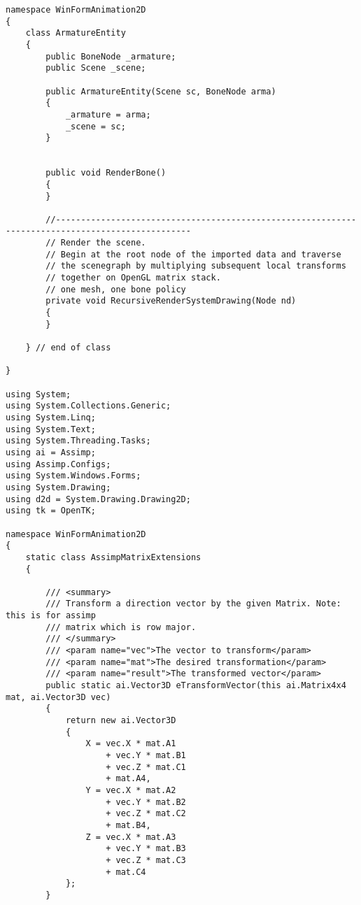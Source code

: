 \begin{scriptsize}
\begin{verbatim}
namespace WinFormAnimation2D
{
    class ArmatureEntity
    {
        public BoneNode _armature;
        public Scene _scene;

        public ArmatureEntity(Scene sc, BoneNode arma)
        {
            _armature = arma;
            _scene = sc;
        }


        public void RenderBone()
        {
        }

        //-------------------------------------------------------------------------------------------------
        // Render the scene.
        // Begin at the root node of the imported data and traverse
        // the scenegraph by multiplying subsequent local transforms
        // together on OpenGL matrix stack.
        // one mesh, one bone policy
        private void RecursiveRenderSystemDrawing(Node nd)
        {
        }

    } // end of class

}

using System;
using System.Collections.Generic;
using System.Linq;
using System.Text;
using System.Threading.Tasks;
using ai = Assimp;
using Assimp.Configs;
using System.Windows.Forms;
using System.Drawing;
using d2d = System.Drawing.Drawing2D;
using tk = OpenTK;

namespace WinFormAnimation2D
{
    static class AssimpMatrixExtensions
    {

        /// <summary>
        /// Transform a direction vector by the given Matrix. Note: this is for assimp 
        /// matrix which is row major.
        /// </summary>
        /// <param name="vec">The vector to transform</param>
        /// <param name="mat">The desired transformation</param>
        /// <param name="result">The transformed vector</param>
        public static ai.Vector3D eTransformVector(this ai.Matrix4x4 mat, ai.Vector3D vec)
        {
            return new ai.Vector3D
            {
                X = vec.X * mat.A1
                    + vec.Y * mat.B1
                    + vec.Z * mat.C1
                    + mat.A4,
                Y = vec.X * mat.A2
                    + vec.Y * mat.B2
                    + vec.Z * mat.C2
                    + mat.B4,
                Z = vec.X * mat.A3
                    + vec.Y * mat.B3
                    + vec.Z * mat.C3
                    + mat.C4
            };
        }


\end{verbatim}
\end{scriptsize}
